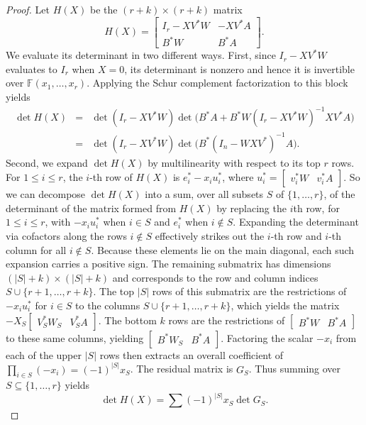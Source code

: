\documentclass{amsart}
\theoremstyle{definition}
\begin{document}
\begin{proof}
Let $H(X)$ be the $(r + k) \times (r + k)$ matrix $$H(X) = \left[\begin{matrix} I_r - X V^* W & -X V^* A \\ B^* W & B^* A \end{matrix}\right].$$ We evaluate its determinant in two different ways. First, since $I_r - X V^* W$ evaluates to $I_r$ when $X = 0$, its determinant is nonzero and hence it is invertible over $\mathbb{F}(x_1, \dots, x_r)$. Applying the Schur complement factorization to this block yields \begin{eqnarray*}\det H(X) &=& \det(I_r - X V^* W) \det\Big( B^*A + B^*W (I_r - X V^* W)^{-1} X V^*A\Big)\\ &=& \det(I_r - X V^* W) \det\Big( B^* (I_n - W X V^*)^{-1} A \Big).\end{eqnarray*} Second, we expand $\det H(X)$ by multilinearity with respect to its top $r$ rows. For $1 \le i \le r$, the $i$-th row of $H(X)$ is $e_i^* - x_i u_i^*$, where $u_i^* = \left[\begin{matrix} v_i^* W & v_i^* A \end{matrix}\right]$. So we can decompose $\det H(X)$ into a sum, over all subsets $S$ of $\{1, \ldots, r\}$, of the determinant of the matrix formed from $H(X)$ by replacing the $i$th row, for $1 \leq i \leq r$, with $-x_i u_i^*$ when $i \in S$ and $e_i^*$ when $i \notin S$. Expanding the determinant via cofactors along the rows $i \not\in S$ effectively strikes out the $i$-th row and $i$-th column for all $i \notin S$. Because these elements lie on the main diagonal, each such expansion carries a positive sign. The remaining submatrix has dimensions $(|S| + k) \times (|S| + k)$ and corresponds to the row and column indices $S \cup \{r+1, \dots, r+k\}$. The top $|S|$ rows of this submatrix are the restrictions of $-x_i u_i^*$ for $i \in S$ to the columns $S \cup \{r+1, \dots, r+k\}$, which yields the matrix $-X_S \left[\begin{matrix} V_S^* W_S & V_S^* A \end{matrix}\right]$. The bottom $k$ rows are the restrictions of $\left[\begin{matrix} B^* W & B^* A \end{matrix}\right]$ to these same columns, yielding $\left[\begin{matrix} B^* W_S & B^* A \end{matrix}\right]$. Factoring the scalar $-x_i$ from each of the upper $|S|$ rows then extracts an overall coefficient of $\prod_{i \in S} (-x_i) = (-1)^{|S|} x_S$. The residual matrix is $G_S$. Thus summing over $S \subseteq \{1, \ldots, r\}$ yields $$ \det H(X) = \sum (-1)^{|S|} x_S \det G_S.$$


\end{proof}
\end{document}

